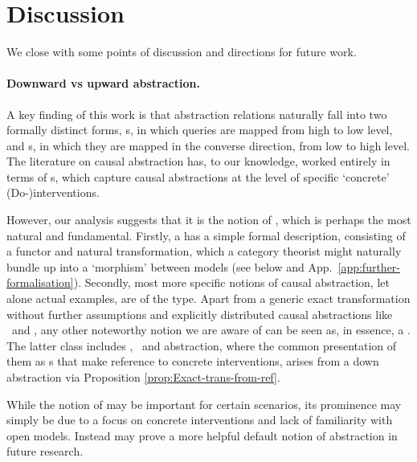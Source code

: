 \documentclass{article}
\begin{document}
\color{black}



\section{Discussion} \label{sec:discussion}

We close with some points of discussion and directions for future work. 

\paragraph{Downward vs upward abstraction.} 
A key finding of this work is that abstraction relations naturally fall into two formally distinct forms, \qdownshort{}s, in which queries are mapped from high to low level, and \qupshort{}s, in which they are mapped in the converse direction, from low to high level. 
The literature on causal abstraction has, to our knowledge, worked entirely in terms of \qupshort{}s, which capture causal abstractions at the level of specific `concrete' (Do-)interventions. 

However, our analysis suggests that it is the notion of \qdownshort{}, which is perhaps the most natural and fundamental. 
Firstly, a \qdownshort{} has a simple formal description, consisting of a functor and natural transformation, which a category theorist might naturally bundle up into a `morphism' between models (see below and App.~\ref{app:further-formalisation}). 
Secondly, most more specific notions of causal abstraction, let alone actual examples, are of the \qdownshort{} type. 
Apart from a generic exact transformation without further assumptions and explicitly distributed causal abstractions like \isoCCA\ and \isointabs, any other noteworthy notion we are aware of can be seen as, in essence, a \qdownshort{}. 
The latter class includes \CCA, \restrictedCCA\ and \CF{} abstraction, where the common presentation of them as \qupshort{}s that make reference to concrete interventions, arises from a down abstraction via Proposition \ref{prop:Exact-trans-from-ref}. 

While the notion of \qupshort{} may be important for certain scenarios, its prominence may simply be due to a focus on concrete interventions and lack of familiarity with open models. Instead \qdownshort{} may prove a more helpful default notion of abstraction in future research. 
\end{document}
